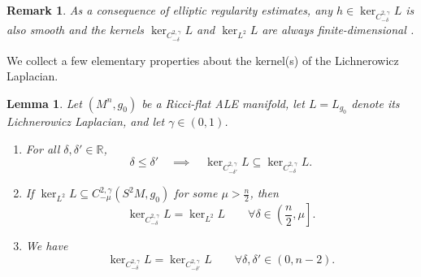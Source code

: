 \documentclass[12pt]{amsart}
\renewcommand{\1}{{\mathbf 1}}
\newcommand{\R}{{\mathbb R}}
\newtheorem{lemma}[thm]{Lemma}
\theoremstyle{others}
\newtheorem{rmk}[thm]{Remark}
\numberwithin{equation}{section}
\begin{document}
\begin{rmk}
    As a consequence of elliptic regularity estimates, any $h \in \ker_{C^{2, \gamma}_{-\delta}} L $ is also smooth 
    and the kernels $\ker_{C^{2, \gamma}_{-\delta}} L$ and $\ker_{L^2} L $ are always finite-dimensional \cite[Theorem 4.21, Corollary 4.23]{Marshall02}.
\end{rmk}

We collect a few elementary properties about the kernel(s) of the Lichnerowicz Laplacian.
\begin{lemma} \label{lem kernel properties}
    Let $(M^n, g_0)$ be a Ricci-flat ALE manifold, let $L= L_{g_0}$ denote its Lichnerowicz Laplacian, and let $\gamma \in (0,1)$.

    \begin{enumerate}

        \item \label{lem kernel properties, item 1}
        For all $\delta, \delta' \in \R$,
            $$\delta \le \delta' \quad \implies\quad  \ker_{C^{2, \gamma}_{-\delta'}} L \subseteq \ker_{C^{2, \gamma}_{-\delta}} L .$$

        \item \label{lem kernel properties, item 2}
        If $\ker_{L^2}L \subseteq C^{2, \gamma}_{-\mu} ( S^2 M, g_0) $ for some $\mu > \frac n2$, then
            $$\ker_{C^{2, \gamma}_{-\delta}} L = \ker_{L^2} L \qquad \forall \delta \in \left(\frac n2 , \mu \right].$$

        \item \label{lem kernel properties, item 3}
        We have
            $$\ker_{C^{2, \gamma}_{-\delta}} L = \ker_{C^{2, \gamma}_{-\delta'}} L \qquad \forall \delta, \delta' \in (0, n-2) .$$
    \end{enumerate}
\end{lemma}
\end{document}
